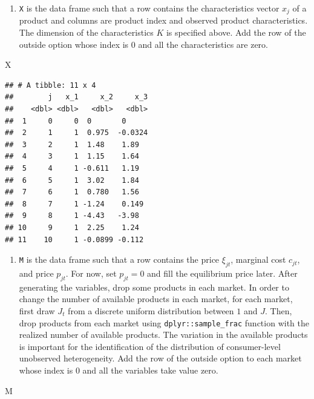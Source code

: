 \documentclass[
]{book}
\newenvironment{Shaded}{\begin{snugshade}}{\end{snugshade}}
\newcommand{\NormalTok}[1]{#1}
\providecommand{\tightlist}{%
  \setlength{\itemsep}{0pt}\setlength{\parskip}{0pt}}
\begin{document}
\begin{enumerate}
\def\labelenumi{\arabic{enumi}.}
\setcounter{enumi}{1}
\tightlist
\item
  \texttt{X} is the data frame such that a row contains the characteristics vector \(x_{j}\) of a product and columns are product index and observed product characteristics. The dimension of the characteristics \(K\) is specified above. Add the row of the outside option whose index is \(0\) and all the characteristics are zero.
\end{enumerate}

\begin{Shaded}
\begin{Highlighting}[]
\NormalTok{X}
\end{Highlighting}
\end{Shaded}

\begin{verbatim}
## # A tibble: 11 x 4
##        j   x_1     x_2     x_3
##    <dbl> <dbl>   <dbl>   <dbl>
##  1     0     0  0       0     
##  2     1     1  0.975  -0.0324
##  3     2     1  1.48    1.89  
##  4     3     1  1.15    1.64  
##  5     4     1 -0.611   1.19  
##  6     5     1  3.02    1.84  
##  7     6     1  0.780   1.56  
##  8     7     1 -1.24    0.149 
##  9     8     1 -4.43   -3.98  
## 10     9     1  2.25    1.24  
## 11    10     1 -0.0899 -0.112
\end{verbatim}

\begin{enumerate}
\def\labelenumi{\arabic{enumi}.}
\setcounter{enumi}{2}
\tightlist
\item
  \texttt{M} is the data frame such that a row contains the price \(\xi_{jt}\), marginal cost \(c_{jt}\), and price \(p_{jt}\). For now, set \(p_{jt} = 0\) and fill the equilibrium price later. After generating the variables, drop some products in each market. In order to change the number of available products in each market, for each market, first draw \(J_t\) from a discrete uniform distribution between \(1\) and \(J\). Then, drop products from each market using \texttt{dplyr::sample\_frac} function with the realized number of available products. The variation in the available products is important for the identification of the distribution of consumer-level unobserved heterogeneity. Add the row of the outside option to each market whose index is \(0\) and all the variables take value zero.
\end{enumerate}

\begin{Shaded}
\begin{Highlighting}[]
\NormalTok{M}
\end{Highlighting}
\end{Shaded}
\end{document}
